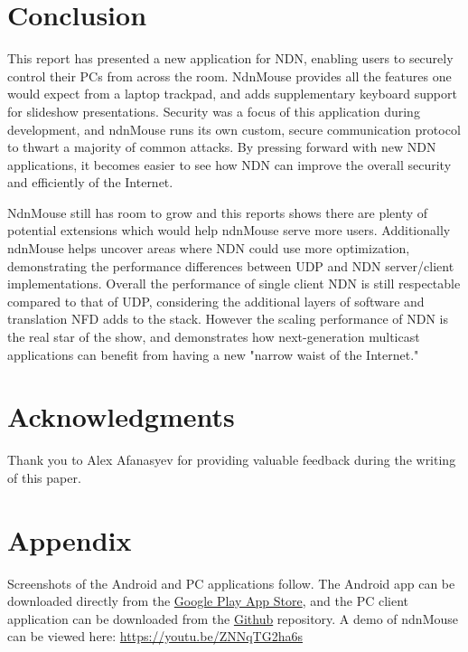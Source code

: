 \documentclass{sig-alternate}
\renewcommand\_{\textunderscore\allowbreak}  %
\begin{document}
\section{Conclusion}
\label{sec:conclusion}
This report has presented a new application for NDN, enabling users to securely control their PCs from across the room. NdnMouse provides all the features one would expect from a laptop trackpad, and adds supplementary keyboard support for slideshow presentations. Security was a focus of this application during development, and ndnMouse runs its own custom, secure communication protocol to thwart a majority of common attacks. By pressing forward with new NDN applications, it becomes easier to see how NDN can improve the overall security and efficiently of the Internet. 

NdnMouse still has room to grow and this reports shows there are plenty of potential extensions which would help ndnMouse serve more users. Additionally ndnMouse helps uncover areas where NDN could use more optimization, demonstrating the performance differences between UDP and NDN server/client implementations. Overall the performance of single client NDN is still respectable compared to that of UDP, considering the additional layers of software and translation NFD adds to the stack. However the scaling performance of NDN is the real star of the show, and demonstrates how next-generation multicast applications can benefit from having a new "narrow waist of the Internet."

\section{Acknowledgments}
Thank you to Alex Afanasyev for providing valuable feedback during the writing of this paper.



\section{Appendix}
\label{sec:appendix}
Screenshots of the Android and PC applications follow. The Android app can be downloaded directly from the \href{https://play.google.com/store/apps/details?id=edu.ucla.cs.ndnmouse}{Google Play App Store}, and the PC client application can be downloaded from the \href{https://github.com/wminner/ndnMouse/tree/master/pc_client}{Github} repository. A demo of ndnMouse can be viewed here: \href{https://youtu.be/ZNNqTG2ha6s}{https://youtu.be/ZNNqTG2ha6s}
\end{document}
